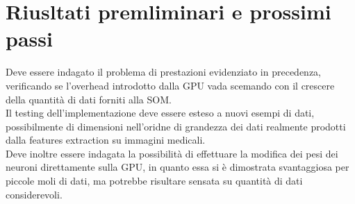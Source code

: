 \section{Riusltati premliminari e prossimi passi}
Deve essere indagato il problema di prestazioni evidenziato in precedenza,  verificando se l'overhead introdotto dalla GPU vada scemando con il crescere della quantità di dati forniti alla SOM.\\
Il testing dell'implementazione deve essere esteso a nuovi esempi di dati, possibilmente di dimensioni nell'oridne di grandezza dei dati realmente prodotti dalla features extraction su immagini medicali.\\
Deve inoltre essere indagata la possibilità di effettuare la modifica dei pesi dei neuroni direttamente sulla GPU, in quanto essa si è dimostrata svantaggiosa per piccole moli di dati, ma potrebbe risultare sensata su quantità di dati considerevoli.\\
